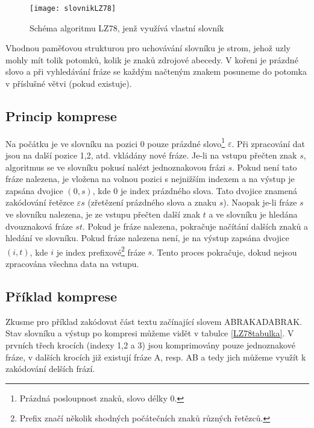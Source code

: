 \begin{figure}[!htb]
\centering
\texttt{[image: slovnikLZ78]}
\caption{Schéma algoritmu LZ78, jenž využívá vlastní slovník}
\label{slovnikLZ78}
\end{figure}

Vhodnou paměťovou strukturou pro uchovávání slovníku je strom, jehož uzly mohly mít tolik potomků, kolik je znaků zdrojové abecedy. V kořeni je prázdné slovo a při vyhledávání fráze se každým načteným znakem posuneme do potomka v příslušné větvi (pokud existuje).

\subsection{Princip komprese}
Na počátku je ve slovníku na pozici 0 pouze prázdné slovo\footnote{Prázdná posloupnost znaků, slovo délky 0.} $\varepsilon$. Při zpracování dat jsou na další pozice 1,2, atd. vkládány nové fráze. Je-li na vstupu přečten znak $s$, algoritmus se ve slovníku pokusí nalézt jednoznakovou frázi $s$. Pokud není tato fráze nalezena, je vložena na volnou pozici s nejnižším indexem a na výstup je zapsána dvojice $(0,s)$, kde 0 je index prázdného slova. Tato dvojice znamená zakódování řetězce $\varepsilon s$ (zřetězení prázdného slova a znaku $s$). Naopak je-li fráze $s$ ve slovníku nalezena, je ze vstupu přečten další znak $t$ a ve slovníku je hledána dvouznaková fráze $st$. Pokud je fráze nalezena, pokračuje načítání dalších znaků a hledání ve slovníku. Pokud fráze nalezena není, je na výstup zapsána dvojice $(i,t)$, kde $i$ je index prefixové\footnote{Prefix značí několik shodných počátečních znaků různých řetězců.} fráze $s$. Tento proces pokračuje, dokud nejsou zpracována všechna data na vstupu.

\subsection{Příklad komprese}
Zkusme pro příklad zakódovat část textu začínající slovem ABRAKADABRAK. Stav slovníku a výstup po kompresi můžeme vidět v tabulce \ref{LZ78tabulka}. V prvních třech krocích (indexy 1,2 a 3) jsou komprimovány pouze jednoznakové fráze, v dalších krocích již existují fráze A, resp. AB a tedy jich můžeme využít k zakódování delších frází.

